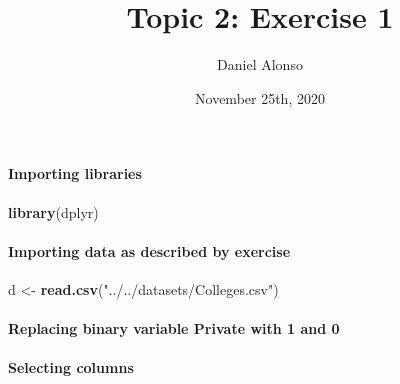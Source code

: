 \documentclass[]{article}
\title{Topic 2: Exercise 1}
\author{Daniel Alonso}
\date{November 25th, 2020}
\newenvironment{Shaded}{\begin{snugshade}}{\end{snugshade}}
\newcommand{\DecValTok}[1]{\textcolor[rgb]{0.00,0.00,0.81}{#1}}
\newcommand{\KeywordTok}[1]{\textcolor[rgb]{0.13,0.29,0.53}{\textbf{#1}}}
\newcommand{\NormalTok}[1]{#1}
\newcommand{\OperatorTok}[1]{\textcolor[rgb]{0.81,0.36,0.00}{\textbf{#1}}}
\newcommand{\StringTok}[1]{\textcolor[rgb]{0.31,0.60,0.02}{#1}}
\let\oldparagraph\paragraph
\renewcommand{\paragraph}[1]{\oldparagraph{#1}\mbox{}}
\begin{document}
\maketitle

\hypertarget{importing-libraries}{%
\paragraph{Importing libraries}\label{importing-libraries}}

\begin{Shaded}
\begin{Highlighting}[]
\KeywordTok{library}\NormalTok{(dplyr)}
\end{Highlighting}
\end{Shaded}

\hypertarget{importing-data-as-described-by-exercise}{%
\paragraph{Importing data as described by
exercise}\label{importing-data-as-described-by-exercise}}

\begin{Shaded}
\begin{Highlighting}[]
\NormalTok{d <-}\StringTok{ }\KeywordTok{read.csv}\NormalTok{(}\StringTok{"../../datasets/Colleges.csv"}\NormalTok{)}
\end{Highlighting}
\end{Shaded}

\hypertarget{replacing-binary-variable-private-with-1-and-0}{%
\paragraph{Replacing binary variable Private with 1 and
0}\label{replacing-binary-variable-private-with-1-and-0}}

\begin{Shaded}
\end{Shaded}

\hypertarget{selecting-columns}{%
\paragraph{Selecting columns}\label{selecting-columns}}
\end{document}
